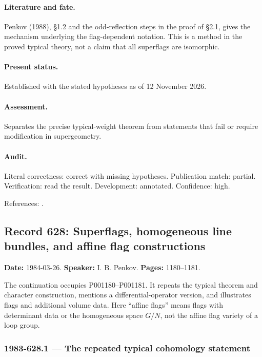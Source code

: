 \paragraph{Literature and fate.} Penkov (1988), \S1.2 and the odd-reflection steps in the proof of \S2.1, gives the mechanism underlying the flag-dependent notation. This is a method in the proved typical theory, not a claim that all superflags are isomorphic.

\paragraph{Present status.} Established with the stated hypotheses as of 12 November 2026.

\paragraph{Assessment.} Separates the precise typical-weight theorem from statements that fail or require modification in supergeometry.

\paragraph{Audit.} Literal correctness: correct with missing hypotheses. Publication match: partial. Verification: read the result. Development: annotated. Confidence: high.

\noindent References: \citep{penkov1988borel}.\par

\subsection{Record 628: Superflags, homogeneous line bundles, and affine flag constructions}

\label{talk:628}

\noindent\textbf{Date:} 1984-03-26. \textbf{Speaker:} I. B. Penkov. \textbf{Pages:} 1180--1181.\par

The continuation occupies P001180–P001181. It repeats the typical theorem and character construction, mentions a differential-operator version, and illustrates flags and additional volume data. Here “affine flags” means flags with determinant data or the homogeneous space \(G/N\), not the affine flag variety of a loop group.

\subsubsection{1983-628.1 --- The repeated typical cohomology statement}

